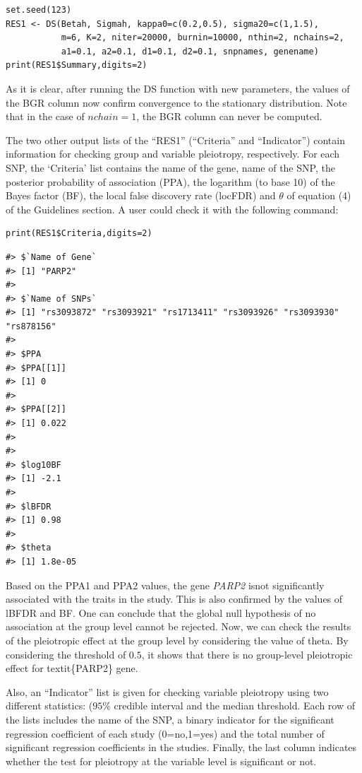 \begin{verbatim}
set.seed(123)
RES1 <- DS(Betah, Sigmah, kappa0=c(0.2,0.5), sigma20=c(1,1.5),
           m=6, K=2, niter=20000, burnin=10000, nthin=2, nchains=2,
           a1=0.1, a2=0.1, d1=0.1, d2=0.1, snpnames, genename)
print(RES1$Summary,digits=2)
\end{verbatim}

As it is clear, after running the DS function with new parameters, the values of the BGR column now confirm convergence to the stationary distribution.
Note that in the case of \(nchain=1\), the BGR column can never be computed.

The two other output lists of the ``RES1'' (``Criteria'' and ``Indicator'') contain information for checking group and variable pleiotropy, respectively.
For each SNP, the `Criteria' list contains the name of the gene, name of the SNP, the posterior probability of association (PPA), the logarithm (to base 10) of
the Bayes factor (BF), the local false discovery rate (locFDR) and \(\theta\) of equation (4) of the Guidelines section. A user could check it with the following command:

\begin{verbatim}
print(RES1$Criteria,digits=2)
\end{verbatim}

\begin{verbatim}
#> $`Name of Gene`
#> [1] "PARP2"
#> 
#> $`Name of SNPs`
#> [1] "rs3093872" "rs3093921" "rs1713411" "rs3093926" "rs3093930" "rs878156" 
#> 
#> $PPA
#> $PPA[[1]]
#> [1] 0
#> 
#> $PPA[[2]]
#> [1] 0.022
#> 
#> 
#> $log10BF
#> [1] -2.1
#> 
#> $lBFDR
#> [1] 0.98
#> 
#> $theta
#> [1] 1.8e-05
\end{verbatim}

Based on the PPA1 and PPA2 values, the gene \emph{PARP2} isnot significantly associated with the traits in the study.
This is also confirmed by the values of lBFDR and BF. One can conclude that the global null hypothesis of no association at the group level cannot be rejected. Now, we can check the results of the pleiotropic effect at the group level by considering the value of theta. By considering the threshold of \(0.5\), it shows that there is no group-level pleiotropic effect for textit\{PARP2\} gene.

Also, an ``Indicator'' list is given for checking variable pleiotropy using two different statistics: (\(95\%\) credible interval and the median threshold. Each row of the lists includes the name of the SNP, a binary indicator for the significant regression coefficient of each study (0=no,1=yes) and the total number of significant regression coefficients in the studies. Finally, the last column indicates whether the test for pleiotropy at the variable level is significant or not.

